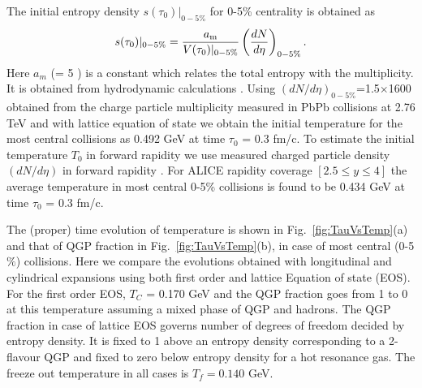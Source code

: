 \documentclass[aps,prc,preprint,superscriptaddress,showpacs,showkeys]{revtex4-1}
\begin{document}
The initial entropy density $s(\tau_0)|_{0-5\%}$ for 0-5\% centrality is obtained as 
\begin{eqnarray}
s(\tau_0)|_{0-5\%}  = {a_{\rm m} \over V(\tau_0)|_{0-5\%}}   \left(\frac{dN}{d\eta}\right)_{0-5\%} . 
\label{TempVsMult}
\end{eqnarray}  
 Here $a_m$ (= 5 ) is a constant which relates the total entropy with the multiplicity. It is
obtained from hydrodynamic calculations \cite{Shuryak:1992wc}. 
Using $(dN/d\eta)_{0-5\%}$=1.5$\times$1600 obtained from the charge particle multiplicity measured in PbPb 
collisions \cite{Aamodt:2010cz,Chatrchyan:2011pb} at 2.76 TeV and with lattice
equation of state we obtain the initial temperature for the most central collisions 
as 0.492 GeV at time $\tau_0$ = 0.3 fm/c. To estimate the initial temperature $T_{0}$ in 
forward rapidity we use measured charged particle density $(dN/d\eta)$ in forward rapidity \cite{Abbas:2013bpa}. 
For ALICE rapidity coverage $[2.5\leq y \leq 4]$ the average temperature in most central 0-5\% collisions 
is found to be 0.434 GeV at time $\tau_0$ = 0.3 fm/c.

The (proper) time evolution of temperature is shown in Fig.~\ref{fig:TauVsTemp}(a) 
and that of QGP fraction in Fig.~\ref{fig:TauVsTemp}(b), in case of most central (0-5$\%$) collisions.
Here we compare the evolutions obtained with longitudinal and cylindrical expansions using 
both first order and lattice Equation of state (EOS). 
 For the first order EOS, $T_C$ = 0.170 GeV and the QGP fraction goes from 1 to 0 at this
temperature assuming a mixed phase of QGP and hadrons.
  The QGP fraction in case of lattice EOS governs number of degrees of freedom 
decided by entropy density. It is fixed to 1 above an entropy density 
corresponding to a 2-flavour QGP and fixed to zero below entropy density for a hot 
resonance gas. The freeze out temperature in all cases is $T_f=0.140$ GeV.  
\end{document}
